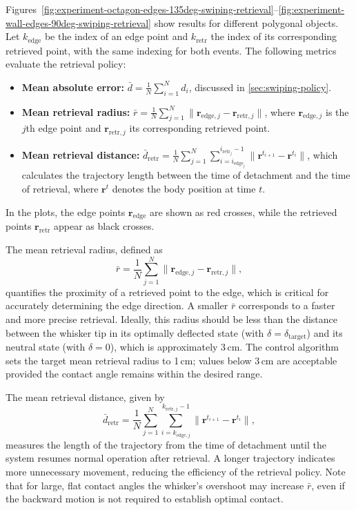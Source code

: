 Figures~\ref{fig:experiment-octagon-edges-135deg-swiping-retrieval}--\ref{fig:experiment-wall-edges-90deg-swiping-retrieval} show results for different polygonal objects.
Let $k_{\mathrm{edge}}$ be the index of an edge point and $k_{\mathrm{retr}}$ the index of its corresponding retrieved point, with the same indexing for both events.
The following metrics evaluate the retrieval policy:
\begin{itemize}
    \item \textbf{Mean absolute error:} $\bar{d} = \frac{1}{N}\sum_{i=1}^{N} d_i$, discussed in \cref{sec:swiping-policy}.
    \item \textbf{Mean retrieval radius:} $\bar{r} = \frac{1}{N}\sum_{j=1}^{N} \|\mathbf{r}_{\mathrm{edge},j} - \mathbf{r}_{\mathrm{retr},j}\|$, where $\mathbf{r}_{\mathrm{edge},j}$ is the $j$th edge point and $\mathbf{r}_{\mathrm{retr},j}$ its corresponding retrieved point.
    \item \textbf{Mean retrieval distance:} $\bar{d}_{\mathrm{retr}} = \frac{1}{N}\sum_{j=1}^{N}\sum_{i=i_{\mathrm{edge}_j}}^{i_{\mathrm{retr}_j}-1} \|\mathbf{r}^{t_{i+1}} - \mathbf{r}^{t_i}\|$, which calculates the trajectory length between the time of detachment and the time of retrieval, where $\mathbf{r}^{t}$ denotes the body position at time $t$.
\end{itemize}
In the plots, the edge points $\mathbf{r}_{\mathrm{edge}}$ are shown as red crosses, while the retrieved points $\mathbf{r}_{\mathrm{retr}}$ appear as black crosses.

The mean retrieval radius, defined as
\[
    \bar{r} = \frac{1}{N}\sum_{j=1}^{N} \|\mathbf{r}_{\mathrm{edge},j} - \mathbf{r}_{\mathrm{retr},j}\|,
\]
quantifies the proximity of a retrieved point to the edge, which is critical for accurately determining the edge direction.
A smaller $\bar{r}$ corresponds to a faster and more precise retrieval.
Ideally, this radius should be less than the distance between the whisker tip in its optimally deflected state (with $\delta=\delta_{\mathrm{target}}$) and its neutral state (with $\delta=0$), which is approximately 3\,cm.
The control algorithm sets the target mean retrieval radius to 1\,cm; values below 3\,cm are acceptable provided the contact angle remains within the desired range.

The mean retrieval distance, given by
\[
    \bar{d}_{\mathrm{retr}} = \frac{1}{N}\sum_{j=1}^{N}\sum_{i=k_{\mathrm{edge},j}}^{k_{\mathrm{retr},j}-1} \|\mathbf{r}^{t_{i+1}} - \mathbf{r}^{t_i}\|,
\]
measures the length of the trajectory from the time of detachment until the system resumes normal operation after retrieval.
A longer trajectory indicates more unnecessary movement, reducing the efficiency of the retrieval policy.
Note that for large, flat contact angles the whisker's overshoot may increase $\bar{r}$, even if the backward motion is not required to establish optimal contact.


